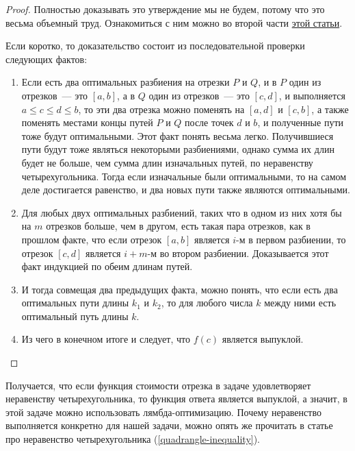 \begin{proof}
    Полностью доказывать это утверждение мы не будем, потому что это весьма объемный труд. Ознакомиться с ним можно во второй части \href{https://cse.hkust.edu.hk/mjg_lib/bibs/DPSu/DPSu.Files/sdarticle_204.pdf}{этой статьи}.

    Если коротко, то доказательство состоит из последовательной проверки следующих фактов:

    \begin{enumerate}
        \item Если есть два оптимальных разбиения на отрезки $P$ и $Q$, и в $P$ один из отрезков~--- это $[a, b]$, а в $Q$ один из отрезков~--- это $[c, d]$, и выполняется $a \le c \le d \le b$, то эти два отрезка можно поменять на $[a, d]$ и $[c, b]$, а также поменять местами концы путей $P$ и $Q$ после точек $d$ и $b$, и полученные пути тоже будут оптимальными. Этот факт понять весьма легко. Получившиеся пути будут тоже являться некоторыми разбиениями, однако сумма их длин будет не больше, чем сумма длин изначальных путей, по неравенству четырехугольника. Тогда если изначальные были оптимальными, то на самом деле достигается равенство, и два новых пути также являются оптимальными.

        \item Для любых двух оптимальных разбиений, таких что в одном из них хотя бы на $m$ отрезков больше, чем в другом, есть такая пара отрезков, как в прошлом факте, что если отрезок $[a, b]$ является $i$-м в первом разбиении, то отрезок $[c, d]$ является $i+m$-м во втором разбиении. Доказывается этот факт индукцией по обеим длинам путей.

        \item И тогда совмещая два предыдущих факта, можно понять, что если есть два оптимальных пути длины $k_1$ и $k_2$, то для любого числа $k$ между ними есть оптимальный путь длины $k$.

        \item Из чего в конечном итоге и следует, что $f(c)$ является выпуклой.
    \end{enumerate}
\end{proof}

Получается, что если функция стоимости отрезка в задаче удовлетворяет неравенству четырехугольника, то функция ответа является выпуклой, а значит, в этой задаче можно использовать лямбда-оптимизацию. Почему неравенство выполняется конкретно для нашей задачи, можно опять же прочитать в статье про неравенство четырехугольника (\ref{quadrangle-inequality}).

